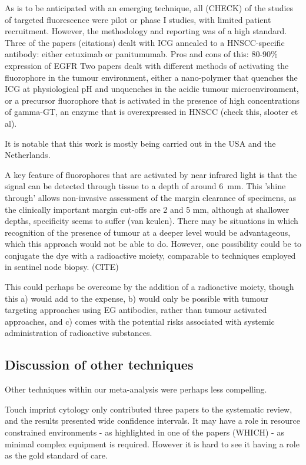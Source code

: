 As is to be anticipated with an emerging technique, all (CHECK) of the studies of targeted fluorescence were pilot or phase I studies, with limited patient recruitment. However, the methodology and reporting was of a high standard.
Three of the papers (citations) dealt with ICG annealed to a HNSCC-specific antibody: either cetuximab or panitumumab.
Pros and cons of this: 80-90\% expression of EGFR
Two papers dealt with different methods of activating the fluorophore in the tumour environment, either a nano-polymer that quenches the ICG at physiological pH and unquenches in the acidic tumour microenvironment, or a precursor fluorophore that is activated in the presence of high concentrations of gamma-GT, an enzyme that is overexpressed in HNSCC (check this, slooter et al).

It is notable that this work is mostly being carried out in the USA and the Netherlands.

A key feature of fluorophores that are activated by near infrared light is that the signal can be detected through tissue to a depth of around \SI{6}{\milli\meter}.
This 'shine through' allows non-invasive assessment of the margin clearance of specimens, as the clinically important margin cut-offs are 2 and 5 mm, although at shallower depths, specificity seems to suffer (van keulen).
There may be situations in which recognition of the presence of tumour at a deeper level would be advantageous, which this approach would not be able to do.
However, one possibility could be to conjugate the dye with a radioactive moiety, comparable to techniques employed in sentinel node biopsy. (CITE)

This could perhaps be overcome by the addition of a radioactive moiety, though this a) would add to the expense, b) would only be possible with tumour targeting approaches using EG antibodies, rather than tumour activated approaches, and c) comes with the potential risks associated with systemic administration of radioactive substances.

\subsection{Discussion of other techniques}

Other techniques within our meta-analysis were perhaps less compelling.

Touch imprint cytology only contributed three papers to the systematic review, and the results presented wide confidence intervals. 
It may have a role in resource constrained environments - as highlighted in one of the papers (WHICH) - as minimal complex equipment is required. 
However it is hard to see it having a role as the gold standard of care.



